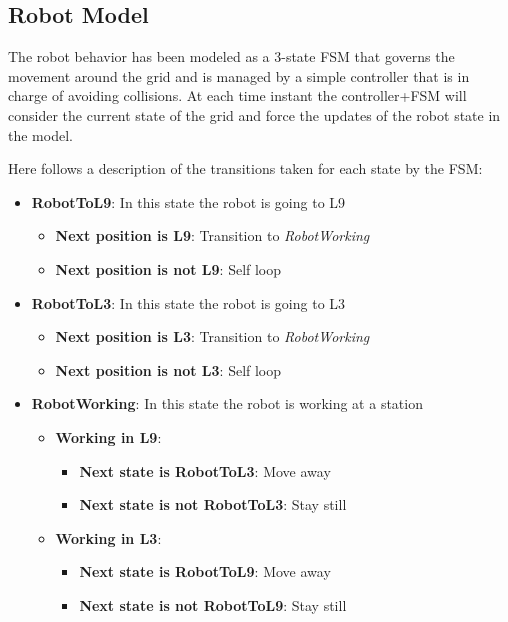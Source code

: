 \subsection{Robot Model}

The robot behavior has been modeled as a 3-state FSM that governs the movement around the grid and is managed by a simple controller that is in charge of avoiding collisions. At each time instant the controller+FSM will consider the current state of the grid and force the updates of the robot state in the model.

Here follows a description of the transitions taken for each state by the FSM:
\begin{itemize}
	\item \textbf{RobotToL9}: In this state the robot is going to L9
	\begin{itemize}
		\item \textbf{Next position is L9}: Transition to \textit{RobotWorking}
		\item \textbf{Next position is not L9}: Self loop
	\end{itemize}

	\item \textbf{RobotToL3}: In this state the robot is going to L3
	\begin{itemize}
		\item \textbf{Next position is L3}: Transition to \textit{RobotWorking}
		\item \textbf{Next position is not L3}: Self loop
	\end{itemize}

	\item \textbf{RobotWorking}: In this state the robot is working at a station
	\begin{itemize}
		\item \textbf{Working in L9}:
			\begin{itemize}
				\item \textbf{Next state is RobotToL3}: Move away
				\item \textbf{Next state is not RobotToL3}: Stay still
			\end{itemize}
		\item \textbf{Working in L3}:
			\begin{itemize}
				\item \textbf{Next state is RobotToL9}: Move away
				\item \textbf{Next state is not RobotToL9}: Stay still
			\end{itemize}
	\end{itemize}
\end{itemize}

